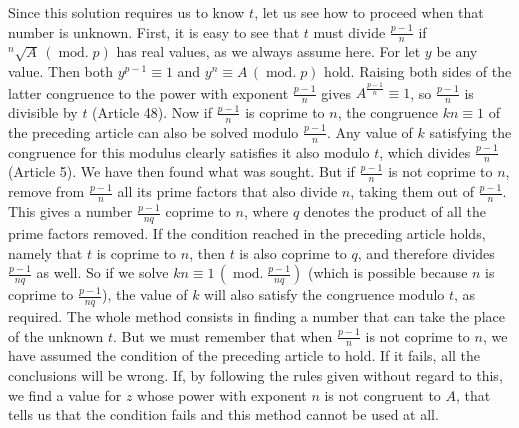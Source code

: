 Since this solution requires us to know $t$, let us see how to proceed when that number is unknown. First, it is easy to see that $t$ must divide $\frac{p-1}{n}$ if ${}^{n}\!\surd {A}\,(\operatorname{mod.}p)$ has real values, as we always assume here. For let $y$ be any value. Then both $y^{p-1}\equiv1$ and $y^n\equiv A\,(\operatorname{mod.}p)$ hold. Raising both sides of the latter congruence to the power with exponent $\frac{p-1}{n}$ gives $A^{\frac{p-1}{n}}\equiv1$, so $\frac{p-1}{n}$ is divisible by $t$ (Article 48). Now if $\frac{p-1}{n}$ is coprime to $n$, the congruence $kn\equiv1$ of the preceding article can also be solved modulo $\frac{p-1}{n}$. Any value of $k$ satisfying the congruence for this modulus clearly satisfies it also modulo $t$, which divides $\frac{p-1}{n}$ (Article 5). We have then found what was sought. But if $\frac{p-1}{n}$ is not coprime to $n$, remove from $\frac{p-1}{n}$ all its prime factors that also divide $n$, taking them out of $\frac{p-1}{n}$. This gives a number $\frac{p-1}{nq}$ coprime to $n$, where $q$ denotes the product of all the prime factors removed. If the condition reached in the preceding article holds, namely that $t$ is coprime to $n$, then $t$ is also coprime to $q$, and therefore divides $\frac{p-1}{nq}$ as well. So if we solve $kn\equiv1\,(\operatorname{mod.}\frac{p-1}{nq})$ (which is possible because $n$ is coprime to $\frac{p-1}{nq}$), the value of $k$ will also satisfy the congruence modulo
$t$, as required. The whole method consists in finding a number that can take the place of the unknown $t$. But we must remember that when $\frac{p-1}{n}$ is not coprime to $n$, we have assumed the condition of the preceding article to hold. If it fails, all the conclusions will be wrong. If, by following the rules given without regard to this, we find a value for $z$ whose power with exponent $n$ is not congruent to $A$, that tells us that the condition fails and this method cannot be used at all.

